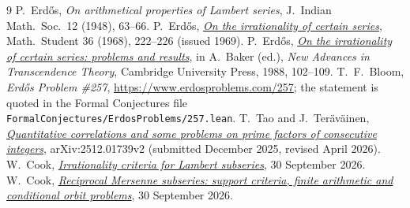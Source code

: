 \documentclass[10pt]{article}
\theoremstyle{plain}
\theoremstyle{definition}
\theoremstyle{remark}
\begin{document}
\begin{thebibliography}{9}
\setlength{\itemsep}{2pt}
\setlength{\parsep}{0pt}
\setlength{\parskip}{0pt}
 P.~Erd\H{o}s, \emph{On arithmetical properties of Lambert
 series}, J.~Indian Math.\ Soc.\ 12 (1948), 63--66.
 P.~Erd\H{o}s,
 \href{https://users.renyi.hu/~p_erdos/1969-09.pdf}{\emph{On the irrationality of
 certain series}}, Math.\ Student 36 (1968), 222--226 (issued 1969).
 P.~Erd\H{o}s,
 \href{https://users.renyi.hu/~p_erdos/1988-22.pdf}{\emph{On the irrationality of
 certain series: problems and results}}, in A.~Baker (ed.), \emph{New Advances
 in Transcendence Theory}, Cambridge University Press, 1988, 102--109.
 T.~F.~Bloom, \emph{Erd\H{o}s Problem \#257},
 \url{https://www.erdosproblems.com/257}; the statement is quoted in the Formal
 Conjectures file \texttt{FormalConjectures/ErdosProblems/257.lean}.
 T.~Tao and J.~Ter\"av\"ainen,
 \href{https://arxiv.org/abs/2512.01739v2}{\emph{Quantitative correlations and
 some problems on prime factors of consecutive integers}}, arXiv:2512.01739v2
 (submitted December 2025, revised April 2026).
 W.~Cook,
 \href{https://github.com/wcook04/plectis-erdos/blob/0064fc9b2a2693de97aebc8abec26090c3cd1095/paper/257/erdos-257-mersenne-support-subseries.pdf}{\emph{Irrationality
 criteria for Lambert subseries}}, 30 September 2026.
 W.~Cook,
 \href{https://github.com/wcook04/plectis-erdos/blob/0064fc9b2a2693de97aebc8abec26090c3cd1095/paper/257/erdos257-mersenne-reasoning-surface.pdf}{\emph{Reciprocal
 Mersenne subseries: support criteria, finite arithmetic and conditional orbit
 problems}}, 30 September 2026.
\end{thebibliography}
\end{document}
